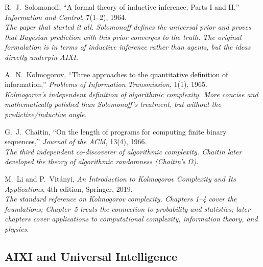\documentclass[11pt,a4paper]{article}
\theoremstyle{definition}
\theoremstyle{remark}
\begin{document}
\begin{description}[style=nextline, leftmargin=1.5em]

\item[\textmd{[Solomonoff, 1964]}]
R.~J.\ Solomonoff,
``A formal theory of inductive inference, Parts I and II,''
\emph{Information and Control}, 7(1--2), 1964.\\
\textit{The paper that started it all.  Solomonoff defines the universal
prior and proves that Bayesian prediction with this prior converges to the
truth.  The original formulation is in terms of inductive inference rather
than agents, but the ideas directly underpin AIXI.}

\item[\textmd{[Kolmogorov, 1965]}]
A.~N.\ Kolmogorov,
``Three approaches to the quantitative definition of information,''
\emph{Problems of Information Transmission}, 1(1), 1965.\\
\textit{Kolmogorov's independent definition of algorithmic complexity.
More concise and mathematically polished than Solomonoff's treatment, but
without the predictive/inductive angle.}

\item[\textmd{[Chaitin, 1966]}]
G.~J.\ Chaitin,
``On the length of programs for computing finite binary sequences,''
\emph{Journal of the ACM}, 13(4), 1966.\\
\textit{The third independent co-discoverer of algorithmic complexity.
Chaitin later developed the theory of algorithmic randomness (Chaitin's
$\Omega$).}

\item[\textmd{[Li \& Vit\'anyi, 2019]}]
M.~Li and P.~Vit\'anyi,
\emph{An Introduction to Kolmogorov Complexity and Its Applications},
4th edition, Springer, 2019.\\
\textit{The standard reference on Kolmogorov complexity.  Chapters 1--4
cover the foundations; Chapter~5 treats the connection to probability and
statistics; later chapters cover applications to computational complexity,
information theory, and physics.}

\end{description}

\subsection*{AIXI and Universal Intelligence}
\end{document}
